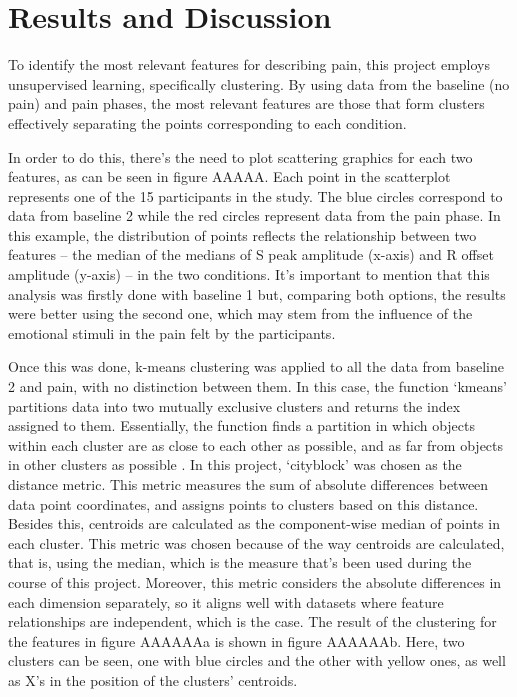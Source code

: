 \chapter{Results and Discussion}

To identify the most relevant features for describing pain, this project employs unsupervised learning, specifically clustering. By using data from the baseline (no pain) and pain phases, the most relevant features are those that form clusters effectively separating the points corresponding to each condition.

In order to do this, there’s the need to plot scattering graphics for each two features, as can be seen in figure AAAAA. Each point in the scatterplot represents one of the 15 participants in the study. The blue circles correspond to data from baseline 2 while the red circles represent data from the pain phase. In this example, the distribution of points reflects the relationship between two features – the median of the medians of S peak amplitude (x-axis) and R offset amplitude (y-axis) – in the two conditions. It’s important to mention that this analysis was firstly done with baseline 1 but, comparing both options, the results were better using the second one, which may stem from the influence of the emotional stimuli in the pain felt by the participants.

Once this was done, k-means clustering was applied to all the data from baseline 2 and pain, with no distinction between them. In this case, the function ‘kmeans’ partitions data into two mutually exclusive clusters and returns the index assigned to them. Essentially, the function finds a partition in which objects within each cluster are as close to each other as possible, and as far from objects in other clusters as possible \cite{Cluster}. In this project, ‘cityblock’ was chosen as the distance metric. This metric measures the sum of absolute differences between data point coordinates, and assigns points to clusters based on this distance. Besides this, centroids are calculated as the component-wise median of points in each cluster. This metric was chosen because of the way centroids are calculated, that is, using the median, which is the measure that’s been used during the course of this project. Moreover, this metric considers the absolute differences in each dimension separately, so it aligns well with datasets where feature relationships are independent, which is the case.
The result of the clustering for the features in figure AAAAAAa is shown in figure AAAAAAb. Here, two clusters can be seen, one with blue circles and the other with yellow ones, as well as X’s in the position of the clusters’ centroids.

